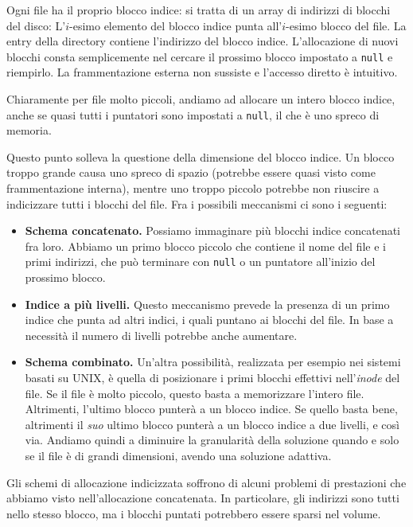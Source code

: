         Ogni file ha il proprio blocco indice: si tratta di un array di indirizzi di blocchi del disco: L'$i$-esimo elemento del blocco indice punta all'$i$-esimo blocco del file. La entry della directory contiene l'indirizzo del blocco indice. L'allocazione di nuovi blocchi consta semplicemente nel cercare il prossimo blocco impostato a \texttt{null} e riempirlo. La frammentazione esterna non sussiste e l'accesso diretto è intuitivo.
        
        Chiaramente per file molto piccoli, andiamo ad allocare un intero blocco indice, anche se quasi tutti i puntatori sono impostati a \texttt{null}, il che è uno spreco di memoria.
        
        Questo punto solleva la questione della dimensione del blocco indice. Un blocco troppo grande causa uno spreco di spazio (potrebbe essere quasi visto come frammentazione interna), mentre uno troppo piccolo potrebbe non riuscire a indicizzare tutti i blocchi del file. Fra i possibili meccanismi ci sono i seguenti:
        \begin{itemize}
            \item \textbf{Schema concatenato.} Possiamo immaginare più blocchi indice concatenati fra loro. Abbiamo un primo blocco piccolo che contiene il nome del file e i primi indirizzi, che può terminare con \texttt{null} o un puntatore all'inizio del prossimo blocco.
            
            \item \textbf{Indice a più livelli.} Questo meccanismo prevede la presenza di un primo indice che punta ad altri indici, i quali puntano ai blocchi del file. In base a necessità il numero di livelli potrebbe anche aumentare.
            
            \item \textbf{Schema combinato.} Un'altra possibilità, realizzata per esempio nei sistemi basati su UNIX, è quella di posizionare i primi blocchi effettivi nell'\textit{inode} del file. Se il file è molto piccolo, questo basta a memorizzare l'intero file. Altrimenti, l'ultimo blocco punterà a un blocco indice. Se quello basta bene, altrimenti il \textit{suo} ultimo blocco punterà a un blocco indice a due livelli, e così via. Andiamo quindi a diminuire la granularità della soluzione quando e solo se il file è di grandi dimensioni, avendo una soluzione adattiva.
        \end{itemize}
        
        Gli schemi di allocazione indicizzata soffrono di alcuni problemi di prestazioni che abbiamo visto nell'allocazione concatenata. In particolare, gli indirizzi sono tutti nello stesso blocco, ma i blocchi puntati potrebbero essere sparsi nel volume.